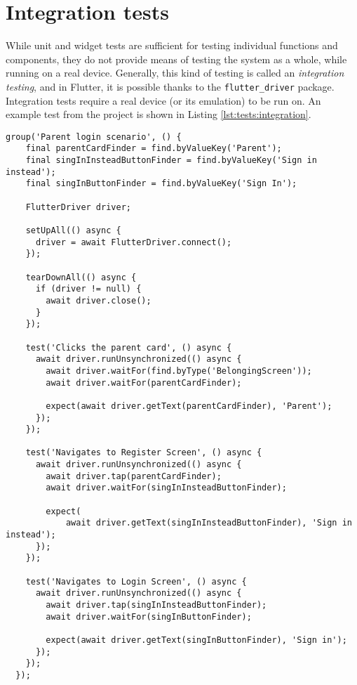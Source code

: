 \section{Integration tests}\label{sec:tests:integration}
While unit and widget tests are sufficient for testing individual functions and components, they do not provide means of testing the system as a whole, while running on a real device. Generally, this kind of testing is called an \textit{integration testing}, and in Flutter, it is possible thanks to the \texttt{flutter\_driver} package. Integration tests require a real device (or its emulation) to be run on. An example test from the project is shown in Listing \ref{lst:tests:integration}.
\\
\begin{lstlisting}[caption={A project integration test example}, label={lst:tests:integration}, captionpos={b}]
group('Parent login scenario', () {
    final parentCardFinder = find.byValueKey('Parent');
    final singInInsteadButtonFinder = find.byValueKey('Sign in instead');
    final singInButtonFinder = find.byValueKey('Sign In');

    FlutterDriver driver;

    setUpAll(() async {
      driver = await FlutterDriver.connect();
    });

    tearDownAll(() async {
      if (driver != null) {
        await driver.close();
      }
    });

    test('Clicks the parent card', () async {
      await driver.runUnsynchronized(() async {
        await driver.waitFor(find.byType('BelongingScreen'));
        await driver.waitFor(parentCardFinder);

        expect(await driver.getText(parentCardFinder), 'Parent');
      });
    });

    test('Navigates to Register Screen', () async {
      await driver.runUnsynchronized(() async {
        await driver.tap(parentCardFinder);
        await driver.waitFor(singInInsteadButtonFinder);

        expect(
            await driver.getText(singInInsteadButtonFinder), 'Sign in instead');
      });
    });

    test('Navigates to Login Screen', () async {
      await driver.runUnsynchronized(() async {
        await driver.tap(singInInsteadButtonFinder);
        await driver.waitFor(singInButtonFinder);

        expect(await driver.getText(singInButtonFinder), 'Sign in');
      });
    });
  });
\end{lstlisting}
